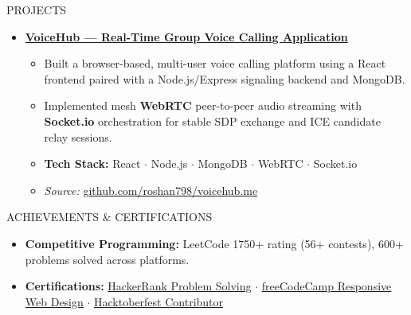 \documentclass{resume} %
\begin{document}
\begin{rSection}{PROJECTS}
\begin{itemize}
        \item \href{https://github.com/roshan798/voicehub.me}{\textbf{VoiceHub --- Real-Time Group Voice Calling Application}}
              \begin{itemize}
                  \itemsep -3pt
                  \item Built a browser-based, multi-user voice calling platform using a React frontend
                        paired with a Node.js/Express signaling backend and MongoDB.
                  \item Implemented mesh \textbf{WebRTC} peer-to-peer audio streaming with
                        \textbf{Socket.io} orchestration for stable SDP exchange and ICE candidate
                        relay sessions.
                  \item \textbf{Tech Stack:} React $\cdot$ Node.js $\cdot$ MongoDB $\cdot$ WebRTC $\cdot$ Socket.io
                  \item \textit{Source:} \href{https://github.com/roshan798/voicehub.me}{github.com/roshan798/voicehub.me}
              \end{itemize}

    \end{itemize}
\end{rSection}

\begin{rSection}{ACHIEVEMENTS \& CERTIFICATIONS}
    \vspace{-0.4em}
    \begin{itemize}
        \itemsep -2pt
        \item \textbf{Competitive Programming:} LeetCode 1750+ rating (56+ contests), 600+ problems solved across platforms.
        \item \textbf{Certifications:} \href{https://www.hackerrank.com/certificates/73bb80c83be4}{HackerRank Problem Solving} $\cdot$ \href{https://www.freecodecamp.org/certification/Roshan_kumar7989/responsive-web-design}{freeCodeCamp Responsive Web Design} $\cdot$ \href{https://tree-nation.com/certificate/6525e97fbca2d}{Hacktoberfest Contributor}
    \end{itemize}
\end{rSection}
\end{document}
